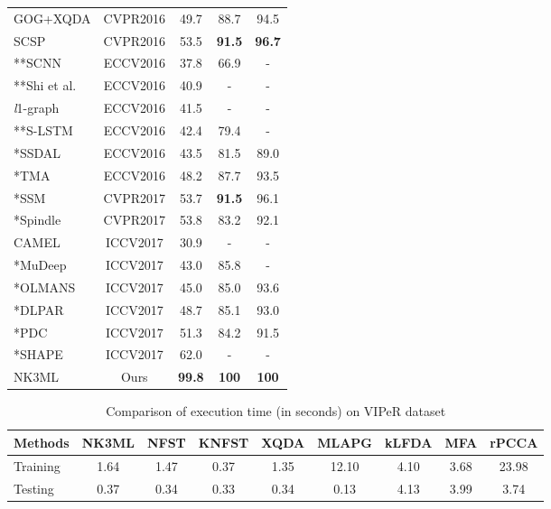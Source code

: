 \documentclass[runningheads]{llncs}
\begin{document}
\begin{table}[h]
\begin{center}
{\begin{tabular}{|l|c|c|c|c|}
GOG+XQDA\cite{GOG}	&	CVPR2016	&	49.7	&	88.7	&	94.5	\\
SCSP\cite{SCSP}	&	CVPR2016	&	53.5	&	\color{blue}\textbf{91.5}	&	\color{blue}\textbf{96.7}	\\
**SCNN\cite{SCNN}	&	ECCV2016	&	37.8	&	66.9	&	-	\\
**Shi et al.\cite{Shi}	&	ECCV2016	&	40.9	&	-	&	-	\\
\textit{l}1-graph\cite{UlGraph}	&	ECCV2016	&	41.5	&	-	&	-	\\
**S-LSTM\cite{SLSTM}	&	ECCV2016	&	42.4	&	79.4	&	-	\\
*SSDAL\cite{SSDAL}	&	ECCV2016	&	43.5	&	81.5	&	89.0\\
*TMA\cite{TMA}	&	ECCV2016	&	48.2	&	87.7	&	93.5	\\
*SSM\cite{song:scalableManifold}	&	CVPR2017	&	53.7	&	\color{blue}\textbf{91.5}	&	96.1   \\
*Spindle\cite{SpindleNet} & CVPR2017 & 53.8	&	83.2	&	92.1\\
CAMEL\cite{CAMEL} & ICCV2017 & 30.9 &	-	&	-	\\
*MuDeep & ICCV2017 & 43.0	&	85.8	& - \\
*OLMANS\cite{OnlineNegSamples} & ICCV2017 & 45.0	&	85.0	&	93.6\\
*DLPAR\cite{DLPAR} & ICCV2017 & 48.7	&	85.1	&	93.0\\
*PDC\cite{PDC} & ICCV2017 & 51.3	&	84.2	&	91.5\\
*SHAPE\cite{SHaPE} & ICCV2017 & 62.0 &	-	&	-	\\
\hline\hline
NK3ML &  Ours & \color{red}\textbf{99.8}	&	\color{red}\textbf{100}	& 	\color{red}\textbf{100}\\
\hline
\end{tabular}
}
\end{center}
\end{table}


\begin{table}[h]
\begin{center}
\setlength{\abovecaptionskip}{9pt}
\caption{Comparison of execution time (in seconds) on VIPeR dataset}
\begin{tabular}{|l|c|c|c|c|c|c|c|c|}
\hline
Methods & NK3ML & NFST& KNFST & XQDA & MLAPG   &
kLFDA   & MFA  &  rPCCA\\
\hline\hline
Training & 	1.64 & 1.47	& 0.37	 & 1.35	&	12.10 &	4.10&	3.68&23.98\\
Testing & 0.37	& 0.34 	& 0.33	&	0.34 & 0.13	&	4.13&	3.99& 3.74\\
\hline
\end{tabular}
\label{table:executionTime}
\end{center}
\end{table}
\end{document}
